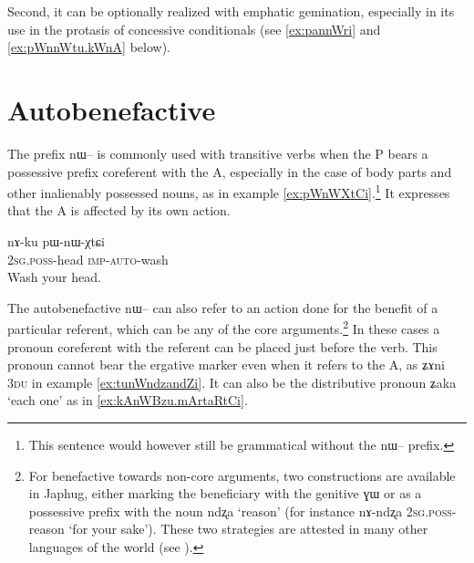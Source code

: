 \documentclass[oldfontcommands,oneside,a4paper,11pt]{article}
\newcommand{\ipa}[1]{{\phon \mbox{#1}}} %
\begin{document}
Second, it can be optionally realized with emphatic gemination, especially in its use in the protasis of concessive conditionals (see \ref{ex:pannWri} and \ref{ex:pWnnWtu.kWnA}  below).


\section{Autobenefactive}

The prefix \ipa{nɯ--}  is commonly used with transitive verbs when the P bears a possessive prefix coreferent with the A, especially in the case of body parts and other inalienably possessed nouns, as in example \ref{ex:pWnWXtCi}.\footnote{This sentence would however still be grammatical without the \ipa{nɯ--} prefix.} It expresses that the A is affected by its own action.

\begin{exe}
\ex \label{ex:pWnWXtCi}
\gll 
\ipa{nɤ-ku} 	\ipa{pɯ-nɯ-χtɕi} \\
\textsc{2sg.poss}-head \textsc{imp-auto}-wash \\
\glt Wash your head.
\end{exe}

The autobenefactive \ipa{nɯ--} can also refer to an action done for the benefit of a particular referent, which can be any of the core arguments.\footnote{For benefactive towards non-core arguments, two constructions are available in Japhug, either marking the beneficiary with the genitive \ipa{ɣɯ} or as a possessive prefix with the noun \ipa{ndʐa} `reason' (for instance \ipa{nɤ-ndʐa} \textsc{2sg.poss}-reason `for your sake'). These two strategies are attested in many other languages of the world (see \citealt[7-10]{zuniga10benefactive}).} In these cases a pronoun coreferent with the referent can be placed just before the verb. This pronoun cannot bear the ergative marker even when it refers to the A, as \ipa{ʑɤni} \textsc{3du} in example \ref{ex:tunWndzandZi}. It can also be the distributive pronoun \ipa{ʑaka} `each one' as in \ref{ex:kAnWBzu.mArtaRtCi}.
\end{document}
